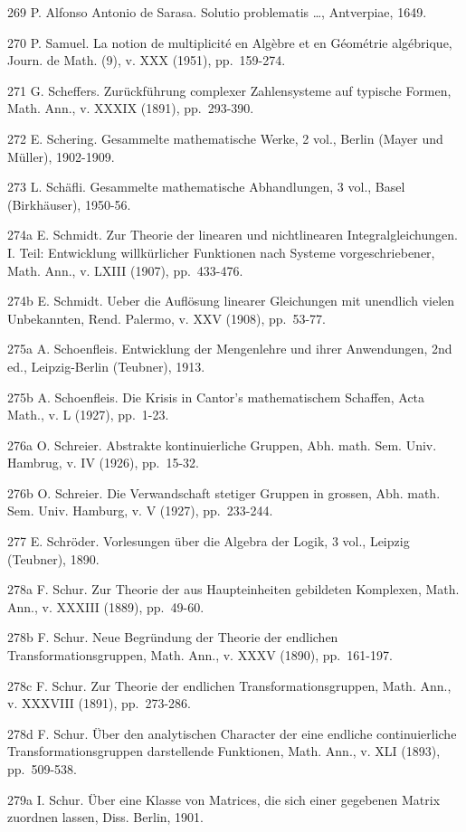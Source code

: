 269 P. Alfonso Antonio de Sarasa. Solutio problematis \ldots, Antverpiae, 1649.

270 P. Samuel. La notion de multiplicité en Algèbre et en Géométrie algébrique, Journ. de Math. (9), v. XXX (1951), pp.~159-274.

271 G. Scheffers. Zurückführung complexer Zahlensysteme auf typische Formen, Math. Ann., v. XXXIX (1891), pp.~293-390.

272 E. Schering. Gesammelte mathematische Werke, 2 vol., Berlin (Mayer und Müller), 1902-1909.

273 L. Schäfli. Gesammelte mathematische Abhandlungen, 3 vol., Basel (Birkhäuser), 1950-56.

274a E. Schmidt. Zur Theorie der linearen und nichtlinearen Integralgleichungen. I. Teil: Entwicklung willkürlicher Funktionen nach Systeme vorgeschriebener, Math. Ann., v. LXIII (1907), pp.~433-476.

274b E. Schmidt. Ueber die Auflösung linearer Gleichungen mit unendlich vielen Unbekannten, Rend. Palermo, v. XXV (1908), pp.~53-77.

275a A. Schoenfleis. Entwicklung der Mengenlehre und ihrer Anwendungen, 2nd ed., Leipzig-Berlin (Teubner), 1913.

275b A. Schoenfleis. Die Krisis in Cantor's mathematischem Schaffen, Acta Math., v. L (1927), pp.~1-23.

276a O. Schreier. Abstrakte kontinuierliche Gruppen, Abh. math. Sem. Univ. Hambrug, v. IV (1926), pp.~15-32.

276b O. Schreier. Die Verwandschaft stetiger Gruppen in grossen, Abh. math. Sem. Univ. Hamburg, v. V (1927), pp.~233-244.

277 E. Schröder. Vorlesungen über die Algebra der Logik, 3 vol., Leipzig (Teubner), 1890.

278a F. Schur. Zur Theorie der aus Haupteinheiten gebildeten Komplexen, Math. Ann., v. XXXIII (1889), pp.~49-60.

278b F. Schur. Neue Begründung der Theorie der endlichen Transformationsgruppen, Math. Ann., v. XXXV (1890), pp.~161-197.

278c F. Schur. Zur Theorie der endlichen Transformationsgruppen, Math. Ann., v. XXXVIII (1891), pp.~273-286.

278d F. Schur. Über den analytischen Character der eine endliche continuierliche Transformationsgruppen darstellende Funktionen, Math. Ann., v. XLI (1893), pp.~509-538.

279a I. Schur. Über eine Klasse von Matrices, die sich einer gegebenen Matrix zuordnen lassen, Diss. Berlin, 1901.

